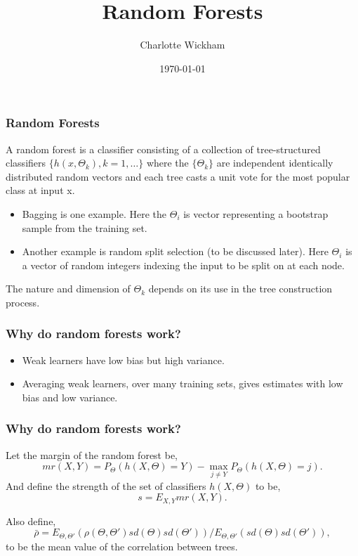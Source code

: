 \documentclass{beamer}
\title{Random Forests}
\author{Charlotte Wickham}
\date{\today}
\begin{document}
\frame{\titlepage}

\begin{frame}
	\frametitle{Random Forests}
\begin{definition}	
	A random forest is a classifier consisting of a collection of tree-structured classifiers $\{h (x, \Theta_k ), k = 1, \ldots\}$ where the $\{\Theta_k \}$ are independent identically distributed 
random vectors and each tree casts a unit vote for the most popular class at input x.
\end{definition}
\begin{itemize}
	\item Bagging is one example.  Here the $\Theta_i$ is vector representing a bootstrap sample from the training set.
	\item Another example is random split selection (to be discussed later).  Here $\Theta_i$ is a vector of random integers indexing the input to be split on at each node.
\end{itemize}
	
The nature and dimension of $\Theta_k$	depends on its use in the tree construction process.
\end{frame}

\begin{frame}
	\frametitle{Why do random forests work?}
	\begin{itemize}
		\item Weak learners have low bias but high variance.
		\item Averaging weak learners, over many training sets, gives estimates with low bias and low variance.
		
	\end{itemize}

\end{frame}

\begin{frame}
	\frametitle{Why do random forests work?}
	Let the margin of the random forest be,
	\[
	mr(X,Y) = P_\Theta(h(X,\Theta) = Y) - \max_{j\ne Y}P_\Theta (h(X,\Theta) = j).
	\]
	And define the strength of the set of classifiers ${h(X,\Theta)}$ to be,
	\[
	s = E_{X,Y}mr(X,Y).
	\]
	
	Also define, 
	\[
	\bar{\rho} = E_{\Theta, \Theta'}(\rho(\Theta, \Theta')sd(\Theta)sd(\Theta'))/ E_{\Theta, \Theta'}(sd(\Theta)sd(\Theta')),
	\]	
	to be the mean value of the correlation  between trees.

\end{frame}
\end{document}
